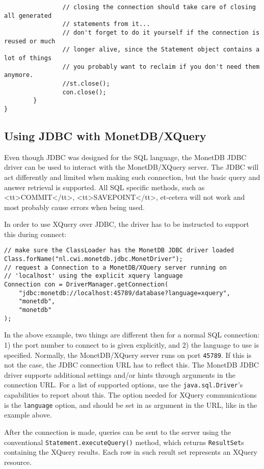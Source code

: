 \documentclass{article}
\begin{document}
\begin{verbatim}
                // closing the connection should take care of closing all generated
                // statements from it...
                // don't forget to do it yourself if the connection is reused or much
                // longer alive, since the Statement object contains a lot of things
                // you probably want to reclaim if you don't need them anymore.
                //st.close();
                con.close();
        }
}
\end{verbatim}

\subsection{Using JDBC with MonetDB/XQuery}
Even though JDBC was designed for the SQL language, the MonetDB JDBC
driver can be used to interact with the MonetDB/XQuery server.  The JDBC
will act differently and limited when making such connection, but the
basic query and answer retrieval is supported.  All SQL specific
methods, such as <tt>COMMIT</tt>, <tt>SAVEPOINT</tt>, et-cetera will not
work and most probably cause errors when being used.

In order to use XQuery over JDBC, the driver has to be instructed to
support this during connect:
\begin{verbatim}
// make sure the ClassLoader has the MonetDB JDBC driver loaded
Class.forName("nl.cwi.monetdb.jdbc.MonetDriver");
// request a Connection to a MonetDB/XQuery server running on
// 'localhost' using the explicit xquery language
Connection con = DriverManager.getConnection(
    "jdbc:monetdb://localhost:45789/database?language=xquery",
    "monetdb",
    "monetdb"
);
\end{verbatim}
In the above example, two things are different then for a normal SQL
connection: 1) the port number to connect to is given explicitly, and 2)
the language to use is specified.  Normally, the MonetDB/XQuery server
runs on port \texttt{45789}.  If this is not the case, the JDBC
connection URL has to reflect this.  The MonetDB JDBC driver supports
additional settings and/or hints through arguments in the connection
URL.  For a list of supported options, use the
\texttt{java.sql.Driver}'s capabilities to report about this.  The
option needed for XQuery communications is the \texttt{language} option,
and should be set in as argument in the URL, like in the example above.

After the connection is made, queries can be sent to the server using
the conventional \texttt{Statement.executeQuery()} method, which returns
\texttt{ResultSet}s containing the XQuery results.  Each row in such
result set represents an XQuery resource.
\end{document}
